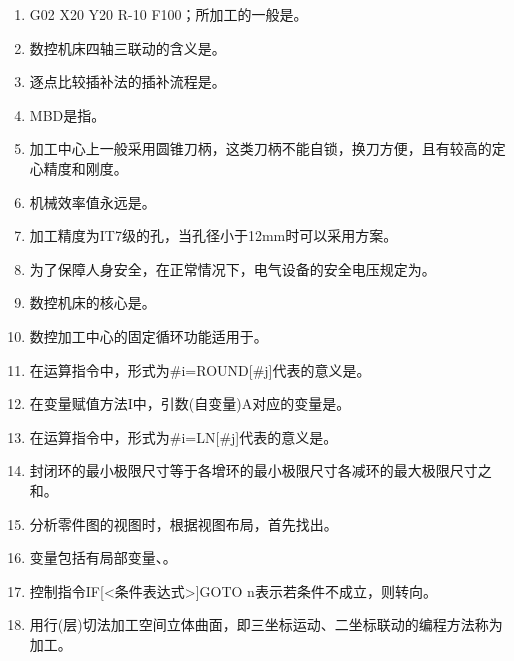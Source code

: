 \documentclass[12pt,twocolumn,landscape,UTF8,twoside]{ctexart}
\begin{document}
\begin{spacing}{1.089}
\begin{enumerate} [1、]
%
\item  G02 X20 Y20 R-10 F100；所加工的一般是。
%
\item 数控机床四轴三联动的含义是。
%
\item 逐点比较插补法的插补流程是。
%
\item MBD是指。
%
\item 加工中心上一般采用圆锥刀柄，这类刀柄不能自锁，换刀方便，且有较高的定心精度和刚度。
%
\item 机械效率值永远是。
%
\item 加工精度为IT7级的孔，当孔径小于12mm时可以采用方案。
%
\item 为了保障人身安全，在正常情况下，电气设备的安全电压规定为。
%
\item 数控机床的核心是。
%
\item 数控加工中心的固定循环功能适用于。
%
\item 在运算指令中，形式为\#i=ROUND[\#j]代表的意义是。
%
\item 在变量赋值方法I中，引数(自变量)A对应的变量是。
%
\item 在运算指令中，形式为\#i=LN[\#j]代表的意义是。
%
\item 封闭环的最小极限尺寸等于各增环的最小极限尺寸各减环的最大极限尺寸之和。
%
\item 分析零件图的视图时，根据视图布局，首先找出。
%
\item 变量包括有局部变量、。
%
\item 控制指令IF[<条件表达式>]GOTO n表示若条件不成立，则转向。
%
\item 用行(层)切法加工空间立体曲面，即三坐标运动、二坐标联动的编程方法称为加工。

\end{enumerate}
\end{spacing}
\end{document}
